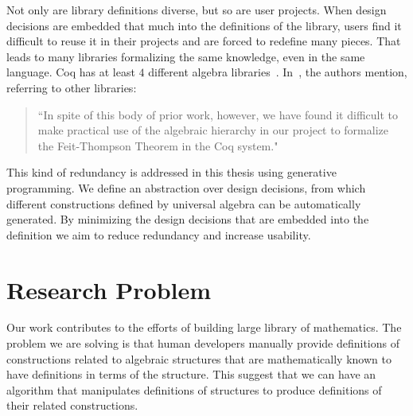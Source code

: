 Not only are library definitions diverse, but so are user projects. When design decisions are embedded that much into the definitions of the library, users find it difficult to reuse it in their projects and are forced to redefine many pieces. That leads to many libraries formalizing the same knowledge, even in the same language. Coq has at least $4$ different algebra libraries~\cite{Gonthier2009,Geuvers2002,coq-contribs-algebra,Spitters2010}. In~\cite{Gonthier2009}, the authors mention, referring to other libraries:  
\begin{quote}
    ``In spite of this body of prior work, however, we have found it
    difficult to make practical use of the algebraic hierarchy in our project to
    formalize the Feit-Thompson Theorem in the Coq system."
\end{quote}

This kind of redundancy is addressed in this thesis using generative programming. We define an abstraction over design decisions, from which different constructions defined by universal algebra can be automatically generated. By minimizing the design decisions that are embedded into the definition we aim to reduce redundancy and increase usability. 

\section{Research Problem}
Our work contributes to the efforts of building large library of mathematics. The problem we are solving is that human developers manually provide definitions of constructions related to algebraic structures that are mathematically known to have definitions in terms of the structure. This suggest that we can have an algorithm that manipulates definitions of structures to produce definitions of their related constructions. 

